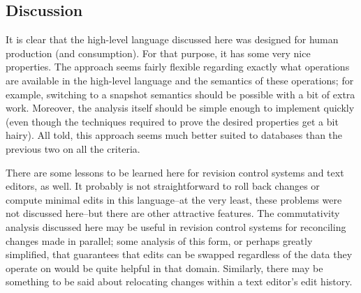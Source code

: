\documentclass{article}
\newif\ifhighlightnew\highlightnewfalse
\newenvironment{newcontent}{\ifhighlightnew\color{green!55!black}[new]\fi}{\ifhighlightnew\color{black}\fi}
\begin{document}
\subsection{Discussion}
It is clear that the high-level language discussed here was designed for
human production (and consumption). For that purpose, it has some very nice
properties. The approach seems fairly flexible regarding exactly what
operations are available in the high-level language and the semantics of
these operations; for example, switching to a snapshot semantics should be
possible with a bit of extra work. Moreover, the analysis itself should be
simple enough to implement quickly (even though the techniques required to
prove the desired properties get a bit hairy).
\begin{newcontent}%
All told, this approach seems much better suited to databases than the
previous two on all the criteria.

There are some lessons to be learned here for revision control systems and
text editors, as well. It probably is not straightforward to roll back
changes or compute minimal edits in this language--at the very least, these
problems were not discussed here--but there are other attractive features.
The commutativity analysis discussed here may be useful in revision control
systems for reconciling changes made in parallel; some analysis of this
form, or perhaps greatly simplified, that guarantees that edits can be
swapped regardless of the data they operate on would be quite helpful in
that domain. Similarly, there may be something to be said about relocating
changes within a text editor's edit history.
\end{newcontent}
\end{document}
